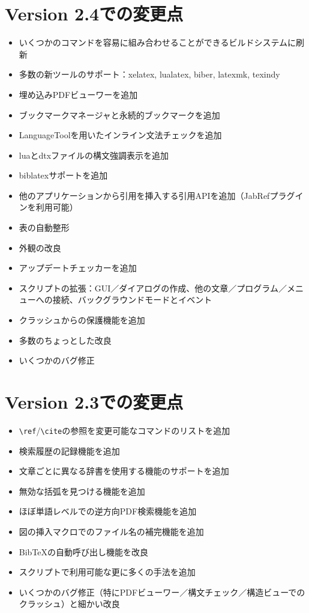 \section{Version 2.4での変更点}

\begin{itemize}
\item
  いくつかのコマンドを容易に組み合わせることができるビルドシステムに刷新
\item
  多数の新ツールのサポート：xelatex, lualatex, biber, latexmk, texindy
\item
  埋め込みPDFビューワーを追加
\item
  ブックマークマネージャと永続的ブックマークを追加
\item
  LanguageToolを用いたインライン文法チェックを追加
\item
  luaとdtxファイルの構文強調表示を追加
\item
  biblatexサポートを追加
\item
  他のアプリケーションから引用を挿入する引用APIを追加（JabRefプラグインを利用可能）
\item
  表の自動整形
\item
  外観の改良
\item
  アップデートチェッカーを追加
\item
  スクリプトの拡張：GUI／ダイアログの作成、他の文章／プログラム／メニューへの接続、バックグラウンドモードとイベント
\item
  クラッシュからの保護機能を追加
\item
  多数のちょっとした改良
\item
  いくつかのバグ修正
\end{itemize}

\section{Version 2.3での変更点}

\begin{itemize}
\item
  \verb+\ref+/\verb+\cite+の参照を変更可能なコマンドのリストを追加
\item
  検索履歴の記録機能を追加
\item
  文章ごとに異なる辞書を使用する機能のサポートを追加
\item
  無効な括弧を見つける機能を追加
\item
  ほぼ単語レベルでの逆方向PDF検索機能を追加
\item
  図の挿入マクロでのファイル名の補完機能を追加
\item
  BibTeXの自動呼び出し機能を改良
\item
  スクリプトで利用可能な更に多くの手法を追加
\item
  いくつかのバグ修正（特にPDFビューワー／構文チェック／構造ビューでのクラッシュ）と細かい改良
\end{itemize}

